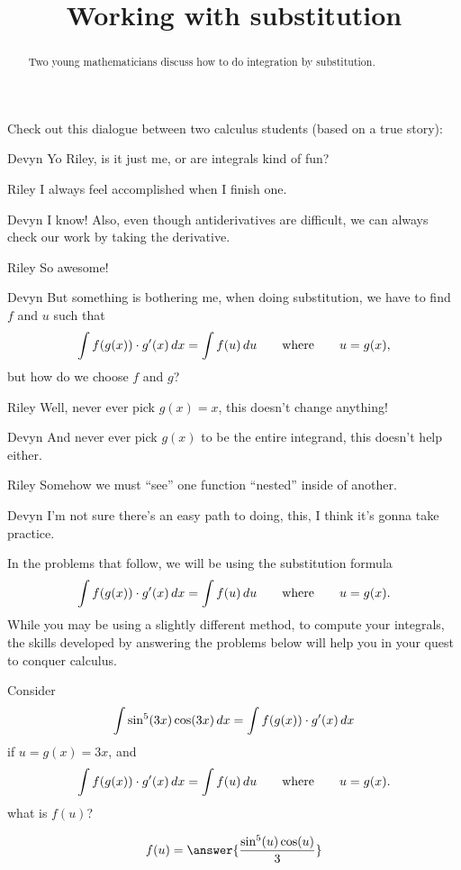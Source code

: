 \documentclass{ximera}
\title[Break-Ground:]{Working with substitution}
\begin{document}
\begin{abstract}
Two young mathematicians discuss how to do integration by
substitution.
\end{abstract}
\maketitle

Check out this dialogue between two calculus students (based on a true
story):

\begin{dialogue}
\item[Devyn] Yo Riley, is it just me, or are integrals kind of fun?
\item[Riley] I always feel accomplished when I finish one.
\item[Devyn] I know! Also, even though antiderivatives are difficult,
  we can always check our work by taking the derivative.
\item[Riley] So awesome!
\item[Devyn] But something is bothering me, when doing substitution,
  we have to find $f$ and $u$ such that
  \[
  \int f(g(x)) \cdot g'(x) \,d x = \int f(u) \,d u\qquad\text{where}\qquad u = g(x),
  \]
  but how do we choose $f$ and $g$?
\item[Riley] Well, never ever pick $g(x) = x$, this doesn't change
    anything!
\item[Devyn] And never ever pick $g(x)$ to be the entire integrand,
  this doesn't help either.
\item[Riley] Somehow we must ``see'' one function ``nested'' inside of
  another.
\item[Devyn] I'm not sure there's an easy path to doing, this, I think
  it's gonna take practice.
\end{dialogue}


In the problems that follow, we will be using the substitution formula
\[
   \int f(g(x)) \cdot g'(x) \,d x = \int f(u) \,d
   u\qquad\text{where}\qquad u = g(x).
\]
While you may be using a slightly different method, to compute your
integrals, the skills developed by answering the problems below will
help you in your quest to conquer calculus.

\begin{problem}
  Consider
  \[
  \int \sin^5(3x) \cos(3x) \,d x = \int f(g(x)) \cdot g'(x) \,d x
  \]
  if $u = g(x) = 3x$, and 
  \[
  \int f(g(x)) \cdot g'(x) \,d x = \int f(u) \,d
  u\qquad\text{where}\qquad u = g(x).
  \]
  what is $f(u)$?
  \begin{prompt}
    \[
    f(u) = \answer{
      \frac{\sin^5(u) \cos(u)}{3}}
    \]
  \end{prompt}
\end{problem}
\end{document}

